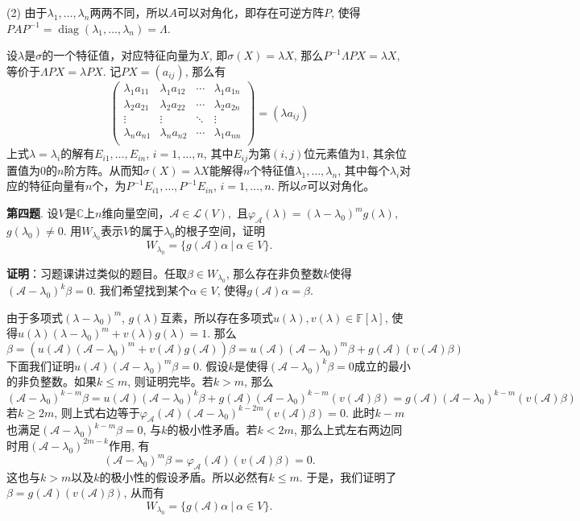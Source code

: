 (2) 由于$\lambda_1,\ldots,\lambda_n$两两不同，所以$A$可以对角化，即存在可逆方阵$P$, 使得$PAP^{-1} = \operatorname{diag}(\lambda_1, \ldots, \lambda_n) = \Lambda$.

设$\lambda$是$\sigma$的一个特征值，对应特征向量为$X$, 即$\sigma(X) = \lambda X$, 那么$P^{-1} \Lambda PX = \lambda X$, 等价于$\Lambda PX = \lambda PX$. 记$PX = (a_{ij})$, 那么有
$$
\begin{pmatrix}
\lambda_1 a_{11} & \lambda_1 a_{12} & \cdots & \lambda_1 a_{1n} \\
\lambda_2 a_{21} & \lambda_2 a_{22} & \cdots & \lambda_2 a_{2n} \\
\vdots & \vdots & \ddots & \vdots \\
\lambda_n a_{n1} & \lambda_n a_{n2} & \cdots & \lambda_1 a_{nn} \\
\end{pmatrix}
= (\lambda a_{ij})
$$
上式$\lambda = \lambda_i$的解有$E_{i1}, \ldots, E_{in}$, $i = 1, \ldots, n$, 其中$E_{ij}$为第$(i,j)$位元素值为$1$, 其余位置值为$0$的$n$阶方阵。从而知$\sigma(X) = \lambda X$能解得$n$个特征值$\lambda_1, \ldots, \lambda_n$, 其中每个$\lambda_i$对应的特征向量有$n$个，为$P^{-1}E_{i1}, \ldots, P^{-1}E_{in}$, $i = 1, \ldots, n$. 所以$\sigma$可以对角化。

\newpageorvspace


{\bf 第四题}. 设$V$是$\mathbb{C}$上$n$维向量空间，$\mathscr{A}\in\mathcal{L}(V),$ 且$\varphi_{\mathscr{A}}(\lambda) = (\lambda - \lambda_0)^m g(\lambda),$ $g(\lambda_0) \neq 0$. 用$W_{\lambda_0}$表示$V$的属于$\lambda_0$的根子空间，证明
$$W_{\lambda_0} = \{ g(\mathscr{A})\alpha \ |\ \alpha \in V \}.$$

{\bf 证明}：习题课讲过类似的题目。任取$\beta \in W_{\lambda_0}$, 那么存在非负整数$k$使得$(\mathscr{A} - \lambda_0)^k \beta = 0$. 我们希望找到某个$\alpha \in V$, 使得$g(\mathscr{A}) \alpha = \beta$.

由于多项式$(\lambda - \lambda_0)^m$, $g(\lambda)$互素，所以存在多项式$u(\lambda), v(\lambda) \in \mathbb{F}[\lambda]$, 使得$u(\lambda)(\lambda-\lambda_0)^m + v(\lambda)g(\lambda) = 1.$ 那么
$$\beta = (u(\mathscr{A})(\mathscr{A}-\lambda_0)^m + v(\mathscr{A})g(\mathscr{A})) \beta = u(\mathscr{A})(\mathscr{A}-\lambda_0)^m \beta + g(\mathscr{A}) (v(\mathscr{A}) \beta)$$
下面我们证明$u(\mathscr{A})(\mathscr{A}-\lambda_0)^m \beta = 0$. 假设$k$是使得$(\mathscr{A} - \lambda_0)^k \beta = 0$成立的最小的非负整数。如果$k \leqslant m$, 则证明完毕。若$k > m$, 那么
$$(\mathscr{A}-\lambda_0)^{k-m} \beta = u(\mathscr{A})(\mathscr{A}-\lambda_0)^k \beta + g(\mathscr{A}) (\mathscr{A}-\lambda_0)^{k-m} (v(\mathscr{A}) \beta) = g(\mathscr{A}) (\mathscr{A}-\lambda_0)^{k-m} (v(\mathscr{A}) \beta)$$
若$k \geqslant 2m$, 则上式右边等于$\varphi_{\mathscr{A}}(\mathscr{A}) (\mathscr{A}-\lambda_0)^{k-2m} (v(\mathscr{A}) \beta) = 0.$ 此时$k - m$也满足$(\mathscr{A} - \lambda_0)^{k-m} \beta = 0$, 与$k$的极小性矛盾。若$k < 2m$, 那么上式左右两边同时用$(\mathscr{A}-\lambda_0)^{2m-k}$作用, 有
$$(\mathscr{A}-\lambda_0)^m \beta = \varphi_{\mathscr{A}}(\mathscr{A}) (v(\mathscr{A}) \beta) = 0.$$
这也与$k > m$以及$k$的极小性的假设矛盾。所以必然有$k \leqslant m$. 于是，我们证明了$\beta = g(\mathscr{A}) (v(\mathscr{A}) \beta)$, 从而有
$$W_{\lambda_0} = \{ g(\mathscr{A})\alpha \ |\ \alpha \in V \}.$$


